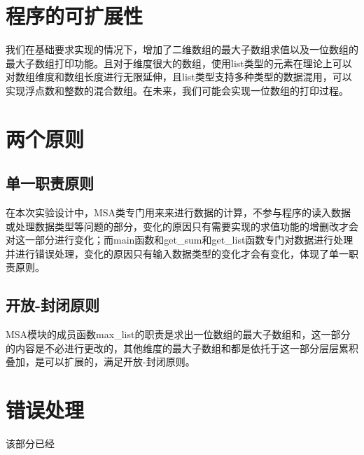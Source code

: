 \documentclass{article}
\begin{document}
\section{程序的可扩展性}
我们在基础要求实现的情况下，增加了二维数组的最大子数组求值以及一位数组的最大子数组打印功能。且对于维度很大的数组，使用list类型的元素在理论上可以对数组维度和数组长度进行无限延伸，且list类型支持多种类型的数据混用，可以实现浮点数和整数的混合数组。在未来，我们可能会实现一位数组的打印过程。
\section{两个原则}
\subsection{单一职责原则}
在本次实验设计中，MSA类专门用来来进行数据的计算，不参与程序的读入数据或处理数据类型等问题的部分，变化的原因只有需要实现的求值功能的增删改才会对这一部分进行变化；而main函数和get\_sum和get\_list函数专门对数据进行处理并进行错误处理，变化的原因只有输入数据类型的变化才会有变化，体现了单一职责原则。
\subsection{开放-封闭原则}
MSA模块的成员函数max\_list的职责是求出一位数组的最大子数组和，这一部分的内容是不必进行更改的，其他维度的最大子数组和都是依托于这一部分层层累积叠加，是可以扩展的，满足开放-封闭原则。
\section{错误处理}
该部分已经
\end{document}
